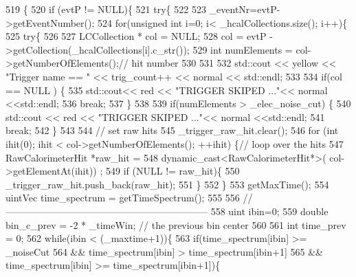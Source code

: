 \begin{DoxyCode}
519 \{       
520   \textcolor{keywordflow}{if} (evtP != NULL)\{
521     \textcolor{keywordflow}{try}\{
522       
523       \_eventNr=evtP->getEventNumber();
524       \textcolor{keywordflow}{for}(\textcolor{keywordtype}{unsigned} \textcolor{keywordtype}{int} i=0; i< \_hcalCollections.size(); i++)\{
525         \textcolor{keywordflow}{try}\{
526           
527           LCCollection * col = NULL;
528           col = evtP ->getCollection(\_hcalCollections[i].c\_str());
529           \textcolor{keywordtype}{int} numElements = col->getNumberOfElements();\textcolor{comment}{// hit number }
530           
531           
532           std::cout << yellow << \textcolor{stringliteral}{"Trigger name == "} << trig\_count++ << normal << std::endl;
533           
534           \textcolor{keywordflow}{if}(col == NULL )  \{
535             std::cout<< red << \textcolor{stringliteral}{"TRIGGER SKIPED ..."}<< normal <<std::endl;
536             \textcolor{keywordflow}{break};
537           \}
538           
539           \textcolor{keywordflow}{if}(numElements > \_elec\_noise\_cut)  \{
540             std::cout << red << \textcolor{stringliteral}{"TRIGGER SKIPED ..."}<< normal <<std::endl;
541             \textcolor{keywordflow}{break};
542           \}
543           
544           \textcolor{comment}{// set raw hits }
545           \_trigger\_raw\_hit.clear();
546           \textcolor{keywordflow}{for} (\textcolor{keywordtype}{int} ihit(0); ihit < col->getNumberOfElements(); ++ihit) \{\textcolor{comment}{// loop over the hits}
547             RawCalorimeterHit *raw\_hit = 
548               \textcolor{keyword}{dynamic\_cast<}RawCalorimeterHit*\textcolor{keyword}{>}( col->getElementAt(ihit)) ;
549             \textcolor{keywordflow}{if} (NULL != raw\_hit)\{
550               \_trigger\_raw\_hit.push\_back(raw\_hit);
551             \}
552           \}
553           getMaxTime();
554           uintVec time\_spectrum = getTimeSpectrum();
555           
556           \textcolor{comment}{//---------------------------------------------------------------}
558 \textcolor{comment}{}          uint ibin=0;
559           \textcolor{keywordtype}{double} bin\_c\_prev = -2 * \_timeWin; \textcolor{comment}{//  the previous bin center}
560           
561           \textcolor{keywordtype}{int} time\_prev = 0;
562           \textcolor{keywordflow}{while}(ibin < (\_maxtime+1))\{ 
563             \textcolor{keywordflow}{if}(time\_spectrum[ibin] >= \_noiseCut
564                && time\_spectrum[ibin] >  time\_spectrum[ibin+1]  
565                && time\_spectrum[ibin] >= time\_spectrum[ibin+1])\{

\end{DoxyCode}
